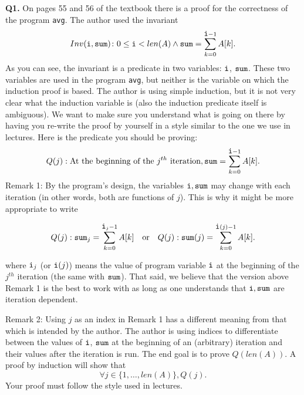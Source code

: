 \documentclass[11pt]{article}
\begin{document}
    \textbf{Q1.} On pages 55 and 56 of the textbook there is a proof for the correctness of the program \verb|avg|. The author used the invariant $$Inv(\verb|i|,\verb|sum|)\colon 0\leq \verb|i| < len(A) \wedge \verb|sum|=\sum_{k=0}^{\verb|i|-1}A[k].$$
    As you can see, the invariant is a predicate in two variables: $\verb|i|$, $\verb|sum|$. These two variables are used in the program \verb|avg|, but neither is the variable on which the induction proof is based.
    The author is using simple induction, but it is not very clear what the induction variable is (also the induction predicate itself is ambiguous). We want to make sure you understand what is going on there by having you re-write the proof by yourself in a style similar to the one we use in lectures. Here is the predicate
    you should be proving:
    $$Q(j): \text{At the beginning of the } j^{th} \text{ iteration}, \verb|sum|=\sum_{k=0}^{\verb|i|-1}A[k].$$
    Remark 1: By the program's design, the variables $\verb|i|,\verb|sum|$ may change with each iteration (in other words, both are functions of $j$). This is why it might be more appropriate to write
    
    $$Q(j): \verb|sum|_j=\sum_{k=0}^{\verb|i|_j-1}A[k] \quad \text{or} \quad Q(j): \verb|sum|(j)=\sum_{k=0}^{\verb|i|(j)-1}A[k].$$

    where $\verb|i|_j$ (or $\verb|i|(j)$) means the value of program variable $\verb|i|$ at the beginning of the $j^{th}$ iteration (the same with $\verb|sum|$).
    That said, we believe that the version above Remark 1 is the best to work with as long as one understands that $\verb|i|,\verb|sum|$ are iteration dependent.

    Remark 2: Using $j$ as an index in Remark 1 has a different meaning from that which is intended by the author. The author is using indices to differentiate between the values of $\verb|i|$, $\verb|sum|$ at the beginning of an (arbitrary) iteration and
    their values after the iteration is run.
    \medskip
    The end goal is to prove $Q(len(A))$. A proof by induction will show that $$\forall
    j\in\{1,\ldots,len(A)\}, Q(j).$$ Your proof must follow the style used in lectures.
\end{document}
